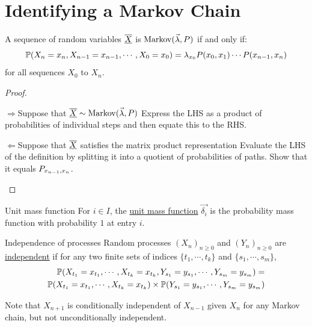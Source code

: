 \documentclass[../Main.tex]{subfiles}
\begin{document}
\section{Identifying a Markov Chain}
\begin{proposition}
    A sequence of random variables $\chain{X}$ is $\Mkv{\vec{\lambda}}{P}$ if and only if:
    \begin{equation*}
        \P(X_n = x_n, X_{n-1} = x_{n-1}, \cdots, X_0 = x_0) = \lambda_{x_0} P(x_0, x_1) \cdots P(x_{n-1}, x_n)
    \end{equation*}
    for all sequences $X_0$ to $X_n$.
    \label{propMarkovAsMatrixProduct}
\end{proposition}
\begin{proof}
    \begin{proofdirection}{$\Rightarrow$}{Suppose that $\chain{X} \sim \Mkv{\vec{\lambda}}{P}$}
        Express the LHS as a product of probabilities of individual steps and then equate this to the RHS.
    \end{proofdirection}
    \begin{proofdirection}{$\Leftarrow$}{Suppose that $\chain{X}$ satisfies the matrix product representation}
        Evaluate the LHS of the definition by splitting it into a quotient of probabilities of paths. Show that it equals $\Pmat{n-1}{n}$.
    \end{proofdirection}
\end{proof}
\begin{definition}{Unit mass function}
    For $i \in I$, the \underline{unit mass function} $\vec{\delta_i}$ is the probability mass function with probability $1$ at entry $i$.
\end{definition}
\begin{definition}{Independence of processes}
    Random processes $(X_n)_{n \geq 0}$ and $(Y_n)_{n \geq 0}$ are  \underline{independent} if for any two finite sets of indices $\{t_1, \cdots, t_k\}$ and $\{s_1, \cdots, s_m\}$,
    \begin{equation*}
        \begin{split}
            \P(X_{t_1} = x_{t_1}, \cdots, X_{t_k} = x_{t_k}, Y_{s_1} = y_{s_1}, \cdots, Y_{s_m} = y_{s_m}) = \\
            \P(X_{t_1} = x_{t_1}, \cdots, X_{t_k} = x_{t_k}) \times \P(Y_{s_1} = y_{s_1}, \cdots, Y_{s_m} = y_{s_m})
        \end{split}
    \end{equation*}
\end{definition}
Note that $X_{n+1}$ is conditionally independent of $X_{n-1}$ given $X_n$ for any Markov chain, but not unconditionally independent.
\end{document}
